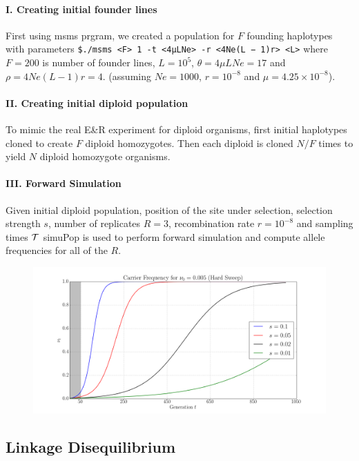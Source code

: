 \documentclass[11pt]{article}
\begin{document}
\paragraph{I. Creating initial founder lines}
First using msms prgram, we created a population for $F$ founding 
haplotypes with parameters \texttt{\$./msms <F> 1 -t <4μLNe> -r <4Ne(L − 
	1)r> <L>} where $F=200$ is number of founder lines, 
$L=10^5$, $\theta=4\mu LNe=17$ and $\rho=4Ne(L-1)r=4$.  (assuming 
$Ne=1000$, $r=10^{-8}$ and $\mu=4.25\times 10^{-8}$).  
\paragraph{II. Creating initial diploid population} 
To mimic the real E\&R experiment for diploid organisms, first initial 
haplotypes cloned to create $F$ diploid homozygotes. Then each diploid is 
cloned $N/F$ times to yield $N$ diploid homozygote organisms.
\paragraph{III. Forward Simulation}
Given initial diploid population, position of the site under selection, selection 
strength $s$, number of replicates $R=3$, recombination rate $r=10^{-8}$ 
and sampling times ${\cal T}$ simuPop is used to perform forward simulation and 
compute allele frequencies for all of the $R$.

\begin{figure}[H]
	\centering
	\includegraphics[trim={ 2in 0 1.8in 0},clip,scale=0.4]{sigmoidHard.png}
\end{figure}

\subsection{Linkage Disequilibrium}
\end{document}

